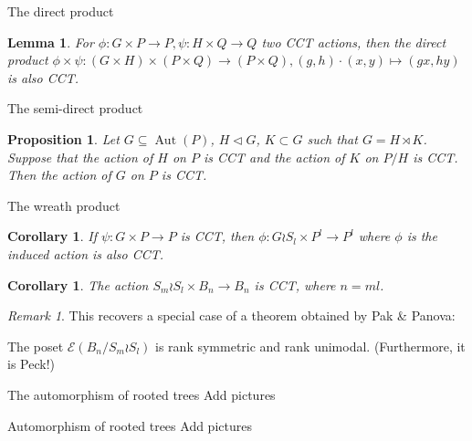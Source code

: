 \documentclass{beamer}
\newtheorem{cor}[thm]{Corollary}
\newtheorem{lem}[thm]{Lemma}
\newtheorem{prop}[thm]{Proposition}
\theoremstyle{remark}
\newtheorem{rem}[thm]{Remark}
\begin{document}
\begin{frame}{The direct product}
\begin{lem}
\label{thm:direct_product_preservation}
For $\phi:G\times P\rightarrow P,\psi:H \times Q \rightarrow Q$ two CCT actions, then the direct product $\phi \times \psi:(G\times H)\times (P\times Q) \rightarrow (P\times Q),(g,h)\cdot (x,y) \mapsto (gx,hy)$ is also CCT.
\end{lem}
\end{frame}





\begin{frame}{The semi-direct product}
\begin{prop}\label{prop:semidirect_product_cover_transitive_actions}
Let $G\subseteq \operatorname{Aut}(P)$, $H\triangleleft G$, $K\subset G$ such that $G = H\rtimes K$.  Suppose that the action of $H$ on $P$ is CCT and the action of $K$ on $P/H$ is CCT.  Then the action of $G$ on $P$ is CCT.
\end{prop}
\end{frame}





\begin{frame}{The wreath product}
\begin{cor}
\label{thm:wreath_preservation}
If $\psi:G\times P \rightarrow P$ is CCT, then $\phi:G\wr S_l \times P^l \rightarrow P^l$ where $\phi$ is the induced action is also CCT.
\end{cor}
\pause
\begin{cor}
The action $S_m \wr S_l \times B_{n} \rightarrow B_{n}$ is CCT, where $n =ml$.
\end{cor}
\pause
\begin{rem}
This recovers a special case of a theorem obtained by Pak \& Panova: 

The poset $\mathcal E (B_n/S_m \wr S_l)$ is rank symmetric and rank unimodal. (Furthermore, it is Peck!)
\end{rem}
\end{frame}





\begin{frame}{The automorphism of rooted trees}
Add pictures
\end{frame}





\begin{frame}{Automorphism of rooted trees}
Add pictures
\end{frame}
\end{document}
